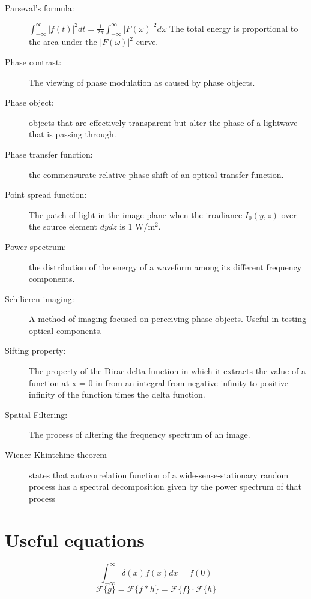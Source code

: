 \documentclass[12pt]{report}
\begin{document}
\begin{description}
\item[Parseval's formula: ] $\int_{-\infty}^\infty |f(t)|^2 dt = \frac{1}{2\pi} \int_{-\infty}^\infty |F(\omega)|^2 d \omega $ The total energy is proportional to the area under the $|F(\omega)|^2$ curve. 
\item[Phase contrast: ] The viewing of phase modulation as caused by phase objects. 
\item[Phase object: ] objects that are effectively transparent but alter the phase of a lightwave that is passing through. 
\item[Phase transfer function: ] the commensurate relative phase shift of an optical transfer function. 
\item[Point spread function: ] The patch of light in the image plane when the irradiance $I_0(y,z)$ over the source element $dydz$ is 1 W/m$^2$. 
\item[Power spectrum: ] the distribution of the energy of a waveform among its different frequency components. 
\item[Schilieren imaging: ] A method of imaging focused on perceiving phase objects. Useful in testing optical components. 
\item[Sifting property: ] The property of the Dirac delta function in which it extracts the value of a function at x = 0 in from an integral from negative infinity to positive infinity of the function times the delta function. 
\item[Spatial Filtering: ] The process of altering the frequency spectrum of an image. 
\item[Wiener-Khintchine theorem] states that autocorrelation function of a wide-sense-stationary random process has a spectral decomposition given by the power spectrum of that process
\end{description}

\section{Useful equations}
\[\int_{-\infty}^\infty \delta (x)f(x) dx = f(0)\]
\[\mathcal{F}\{g\} = \mathcal{F}\{f*h\} = \mathcal{F} \{f\} \cdot \mathcal{F}\{h\} \]
\end{document}
